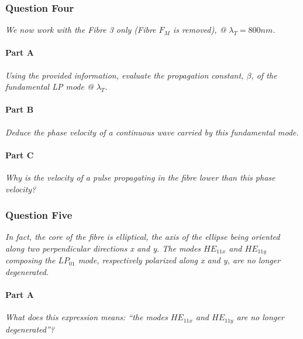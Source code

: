 \documentclass[colorlinks,11pt,a4paper,normalphoto,withhyper,ragged2e]{altareport}
\begin{document}
\newpage




\subsubsection{Question Four}
\textit{We now work with the Fibre 3 only (Fibre $F_M$ is removed), @ $\lambda_T = 800nm$.}




\paragraph{Part A \linebreak}
\textit{Using the provided information, evaluate the propagation constant, $\beta$, of the fundamental LP mode @ $\lambda_T$.} \linebreak




\paragraph{Part B \linebreak}
\textit{Deduce the phase velocity of a continuous wave carried by this fundamental mode.} \linebreak




\paragraph{Part C \linebreak}
\textit{Why is the velocity of a pulse propagating in the fibre lower than this phase velocity?} \linebreak




\newpage




\subsubsection{Question Five}
\textit{In fact, the core of the fibre is elliptical, the axis of the ellipse being oriented along two perpendicular directions x and y. The modes $HE_{11x}$ and $HE_{11y}$ composing the $LP_{01}$ mode, respectively polarized along x and y, are no longer degenerated.}




\paragraph{Part A \linebreak}
\textit{What does this expression means: ``the modes $HE_{11x}$ and $HE_{11y}$ are no longer degenerated''?} \linebreak
\end{document}
